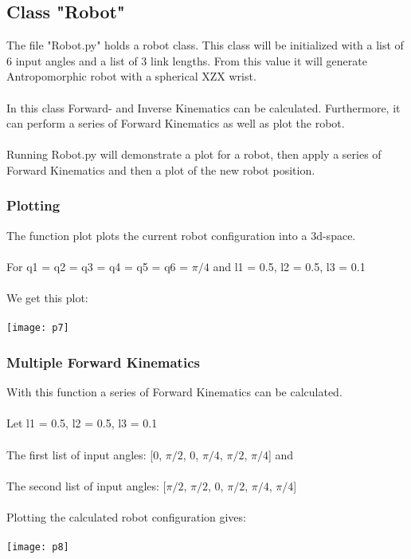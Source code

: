 \documentclass{article}
\begin{document}
	\subsection{Class "Robot"}
	The file "Robot.py" holds a robot class. This class will be initialized with a list of  6 input angles and a list of 3 link lengths. From this value it will generate Antropomorphic robot with a spherical XZX wrist. \\
	\\
	In this class Forward- and Inverse Kinematics can be calculated. Furthermore, it can perform a series of Forward Kinematics as well as plot the robot. \\\\Running Robot.py will demonstrate a plot for a robot, then apply a series of Forward Kinematics and then a plot of the new robot position. 
	\subsubsection{Plotting}
	The function plot plots the current robot configuration into a 3d-space.\\\\
	For q1 = q2 = q3 = q4 = q5 = q6 = ${\pi/4}$ and l1 = 0.5, l2 = 0.5, l3 = 0.1 \\\\We get this plot:\\\\
	\texttt{[image: p7]}
	\subsubsection{Multiple Forward Kinematics}
	With this function a series of Forward Kinematics can be calculated.\\\\ 
	Let l1 = 0.5, l2 = 0.5, l3 = 0.1\\\\
	The first list of input angles: [0, ${\pi/2}$, 0, ${\pi/4}$, ${\pi/2}$, ${\pi/4}$] and\\\\
	The second list of input angles: [${\pi/2}$, ${\pi/2}$, 0, ${\pi/2}$, ${\pi/4}$, ${\pi/4}$]\\\\
	Plotting the calculated robot configuration gives:\\\\
	\texttt{[image: p8]}
	
\end{document}
